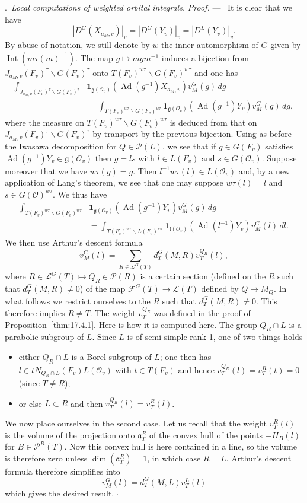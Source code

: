 \documentclass[12pt,a4paper,oneside,english,leqno]{smfart}
\makeatletter
\numberwithin{equation}{subsection}
\newcounter{theo}
\numberwithin{theo}{subsection}
\newenvironment{paragr}[1][]{\medskip\refstepcounter{subsection}%
  \par\noindent\hspace*{\parindent}\thesubsection.\ \emph{#1}%
  \@ifundefined{@empty}{}{}\ignorespaces}{\medskip}
\theoremstyle{plain}
\theoremstyle{definition}
\theoremstyle{remark}
\newenvironment{preuve}[1][]{\medskip\noindent\textit{Proof.} #1 ---\ }%
  {\hfill\ensuremath{\square}\medskip}
\DeclareMathOperator{\Ad}{Ad}
\DeclareMathOperator{\Int}{Int}
\newcommand{\oc}{\mathcal{O}}
\newcommand{\lc}{\mathcal{L}}
\newcommand{\fc}{\mathcal{F}}
\newcommand{\pc}{\mathcal{P}}
\newcommand{\ggo}{\mathfrak{g}}
\newcommand{\ago}{\mathfrak{a}}
\newcommand{\lgo}{\mathfrak{l}}
\newcommand{\back}{\backslash}
\makeatother
\begin{document}
\begin{paragr}[Local computations of weighted orbital integrals.]
\begin{preuve}
It is clear that we have
$$
|D^G(X_{a_M,v})|_v=|D^G(Y_v)|_v=|D^L(Y_v)|_v.
$$
By abuse of notation, we still denote by $w$ the inner automorphism of $G$ given by $\Int(m\tau(m)^{-1})$. The map $g\mapsto mgm^{-1}$ induces a bijection from $J_{a_M,v}(F_v)^\tau\back G(F_v)^\tau$ onto $T(F_v)^{w\tau}\back G(F_v)^{w\tau}$ and one has
\[
\begin{aligned}
\int_{J_{a_M,v}(F_v)^\tau\back G(F_v)^\tau}&
\mathbf{1}_{\ggo(\oc_v)}(\Ad(g^{-1})X_{a_M,v})v^G_M(g)\,dg\\
&=\int_{T(F_v)^{w\tau}\back G(F_v)^{w\tau}}
\mathbf{1}_{\ggo(\oc_v)}(\Ad(g^{-1})Y_v)v^G_M(g)\,dg,
\end{aligned}
\]
where the measure on $T(F_v)^{w\tau}\back G(F_v)^{w\tau}$ is deduced from that on $J_{a_M,v}(F_v)^\tau\back G(F_v)^\tau$ by transport by the previous bijection. Using as before the Iwasawa decomposition for $Q\in\pc(L)$, we see that if $g\in G(F_v)$ satisfies $\Ad(g^{-1})Y_v\in\ggo(\oc_v)$ then $g=ls$ with $l\in L(F_v)$ and $s\in G(\oc_v)$. Suppose moreover that we have $w\tau(g)=g$. Then $l^{-1}w\tau(l)\in L(\oc_v)$ and, by a new application of Lang's theorem, we see that one may suppose $w\tau(l)=l$ and $s\in G(\oc)^{w\tau}$. We thus have
\[
\begin{aligned}
\int_{T(F_v)^{w\tau}\back G(F_v)^{w\tau}}&
\mathbf{1}_{\ggo(\oc_v)}(\Ad(g^{-1})Y_v)v^G_M(g)\,dg\\
&=\int_{T(F_v)^{w\tau}\back L(F_v)^{w\tau}}
\mathbf{1}_{\lgo(\oc_v)}(\Ad(l^{-1})Y_v)v^G_M(l)\,dl.
\end{aligned}
\]
We then use Arthur's descent formula
$$
v^G_M(l)=\sum_{R\in\lc^G(T)}d^G_T(M,R)v^{Q_R}_T(l),
$$
where $R\in\lc^G(T)\mapsto Q_R\in\pc(R)$ is a certain section (defined on the $R$ such that $d^G_T(M,R)\neq 0$) of the map $\fc^G(T)\to\lc(T)$ defined by $Q\mapsto M_Q$. In what follows we restrict ourselves to the $R$ such that $d^G_T(M,R)\neq 0$. This therefore implies $R\neq T$. The weight $v^{Q_R}_T$ was defined in the proof of Proposition~\ref{thm:17.4.1}. Here is how it is computed here. The group $Q_R\cap L$ is a parabolic subgroup of $L$. Since $L$ is of semi-simple rank 1, one of two things holds
\begin{itemize}
\item[--] either $Q_R\cap L$ is a Borel subgroup of $L$; one then has $l\in tN_{Q_R\cap L}(F_v)L(\oc_v)$ with $t\in T(F_v)$ and hence $v^{Q_R}_T(l)=v^R_T(t)=0$ (since $T\neq R$); \item[--] or else $L\subset R$ and then $v^{Q_R}_T(l)=v^R_T(l)$.
\end{itemize}
We now place ourselves in the second case. Let us recall that the weight $v^R_T(l)$ is the volume of the projection onto $\ago^R_T$ of the convex hull of the points $-H_B(l)$ for $B\in\pc^R(T)$. Now this convex hull is here contained in a line, so the volume is therefore zero unless $\dim(\ago^R_T)=1$, in which case $R=L$. Arthur's descent formula therefore simplifies into
$$
v^G_M(l)=d^G_T(M,L)v^L_T(l)
$$
which gives the desired result.
\end{preuve}
\end{paragr}
\end{document}
